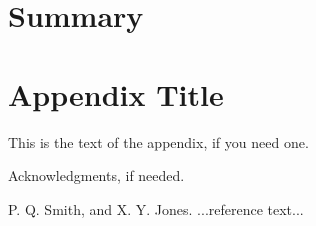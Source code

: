 \documentclass[preprint]{sigplanconf}
\begin{document}
\section{Summary}

\appendix
\section{Appendix Title}

This is the text of the appendix, if you need one.

\acks

Acknowledgments, if needed.





\begin{thebibliography}{}
\softraggedright

P. Q. Smith, and X. Y. Jones. ...reference text...

\end{thebibliography}
\end{document}
